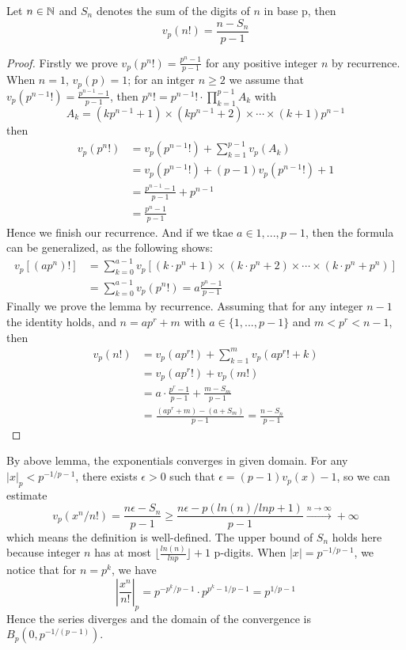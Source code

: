 \begin{lemma}
    Let \(n \in \mathbb{N}\) and \(S_n\) denotes the sum of the digits of \(n\) in base p, then 
    \[v_p(n!) =  \frac{n-S_n}{p-1}\]

    \begin{proof}
        Firstly we prove \(v_p(p^n!) = \frac{p^n-1}{p-1}\) for any positive integer \(n\) by recurrence. When \(n=1\), \(v_p(p) = 1\); for an intger \(n \geq 2\) we assume that \(v_p(p^{n-1}!) = \frac{p^{n-1}-1}{p-1}\), then \(p^n! = p^{n-1}! \cdot \prod_{k=1}^{p-1} A_k\) with
        \[A_k = (kp^{n-1}+1) \times (kp^{n-1}+2)\times \cdots \times (k+1)p^{n-1}\]
        then
        \begin{align*}
            v_p(p^n !) &= v_p(p^{n-1}!) + \sum_{k=1}^{p-1}v_p(A_k)\\
            &= v_p(p^{n-1}!) + (p-1)v_p(p^{n-1}!)+1 \\
            &= \frac{p^{n-1}-1}{p-1}+p^{n-1} \\
            &= \frac{p^{n}-1}{p-1}
        \end{align*}
        Hence we finish our recurrence. And if we tkae \(a \in {1,...,p-1}\), then the formula can be generalized, as the following shows:
        \begin{align*}
            v_p[(ap^n)!] &= \sum_{k=0}^{a-1}v_p[(k\cdot p^n +1)\times(k\cdot p^n +2) \times \cdots \times  (k\cdot p^n + p^n)] \\
            &= \sum_{k=0}^{a-1}v_p(p^n!) = a\frac{p^n-1}{p-1}
        \end{align*}
        Finally we prove the lemma by recurrence. Assuming that for any integer \(n-1\) the identity holds, and \(n= ap^r+m\) with \(a \in \{1,...,p-1\} \) and \(m<p^r<n-1\), then
        \begin{align*}
            v_p(n!) &= v_p(ap^r!)+\sum_{k=1}^{m}v_p(ap^r!+k)\\
            &= v_p(ap^r!)+v_p(m!) \\
            &= a\cdot \frac{p^r-1}{p-1}+\frac{m-S_m}{p-1}\\
            &= \frac{(ap^r+m)-(a+S_m)}{p-1} = \frac{n-S_n}{p-1}
        \end{align*}
    \end{proof}
\end{lemma}

By above lemma, the exponentials converges in given domain. For any \(|x|_p < p^{-1/p-1}\), there exists \(\epsilon>0\) such that \(\epsilon = (p-1)v_p(x)-1\), so we can estimate
\[v_p(x^n/n!) = \frac{n\epsilon-S_n}{p-1} \geq \frac{n\epsilon-p(ln(n)/lnp+1)}{p-1} \xrightarrow{n \rightarrow \infty} +\infty\]
which means the definition is well-defined. The upper bound of \(S_n\) holds here because integer \(n\) has at most \(\lfloor\frac{ln(n)}{lnp}\rfloor+1\) p-digits. When \(|x| = p^{-1/p-1}\), we notice that for \(n = p^k\), we have
\[|\frac{x^n}{n!}|_p  = p^{-p^k/p-1}\cdot p^{p^k-1/p-1} = p^{1/p-1} \]
Hence  the series diverges and the domain of the convergence is \(B_p(0,p^{-1/(p-1)})\). 
\newline

